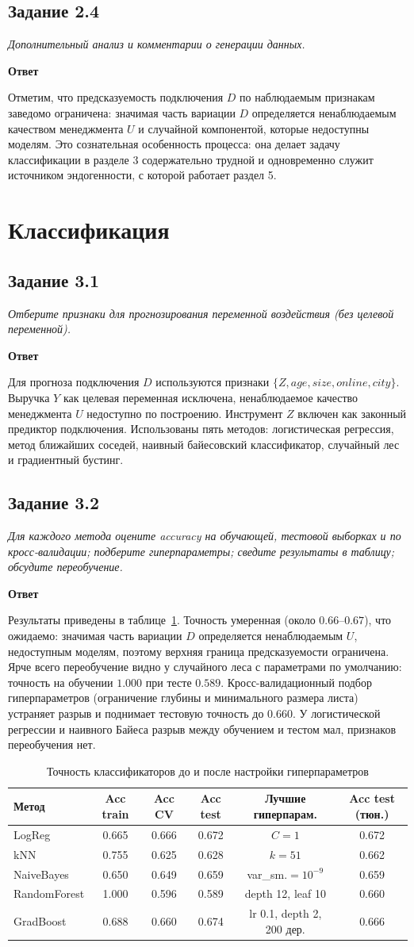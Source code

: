 \documentclass[12pt,a4paper]{article}
\newcommand{\zadanie}[2]{\subsection*{Задание #1}\begingroup\itshape #2\par\endgroup\medskip}
\newcommand{\otvet}{\par\noindent\textbf{Ответ}\par\medskip}
\begin{document}
\zadanie{2.4}{Дополнительный анализ и комментарии о генерации данных.}
\otvet
Отметим, что предсказуемость подключения $D$ по наблюдаемым признакам заведомо ограничена: значимая часть вариации $D$ определяется ненаблюдаемым качеством менеджмента $U$ и случайной компонентой, которые недоступны моделям. Это сознательная особенность процесса: она делает задачу классификации в разделе 3 содержательно трудной и одновременно служит источником эндогенности, с которой работает раздел 5.

\section{Классификация}

\zadanie{3.1}{Отберите признаки для прогнозирования переменной воздействия (без целевой переменной).}
\otvet
Для прогноза подключения $D$ используются признаки $\{Z,\textit{age},\textit{size},\textit{online},\textit{city}\}$. Выручка $Y$ как целевая переменная исключена, ненаблюдаемое качество менеджмента $U$ недоступно по построению. Инструмент $Z$ включен как законный предиктор подключения. Использованы пять методов: логистическая регрессия, метод ближайших соседей, наивный байесовский классификатор, случайный лес и градиентный бустинг.

\zadanie{3.2}{Для каждого метода оцените accuracy на обучающей, тестовой выборках и по кросс-валидации; подберите гиперпараметры; сведите результаты в таблицу; обсудите переобучение.}
\otvet
Результаты приведены в таблице~\ref{tab:clf_tuning}. Точность умеренная (около $0.66$--$0.67$), что ожидаемо: значимая часть вариации $D$ определяется ненаблюдаемым $U$, недоступным моделям, поэтому верхняя граница предсказуемости ограничена. Ярче всего переобучение видно у случайного леса с параметрами по умолчанию: точность на обучении $1.000$ при тесте $0.589$. Кросс-валидационный подбор гиперпараметров (ограничение глубины и минимального размера листа) устраняет разрыв и поднимает тестовую точность до $0.660$. У логистической регрессии и наивного Байеса разрыв между обучением и тестом мал, признаков переобучения нет.

\begin{table}[H]\centering\small
\caption{Точность классификаторов до и после настройки гиперпараметров}\label{tab:clf_tuning}
\begin{tabular}{lccccc}\toprule
Метод & Acc train & Acc CV & Acc test & Лучшие гиперпарам. & Acc test (тюн.)\\\midrule
LogReg & 0.665 & 0.666 & 0.672 & $C=1$ & 0.672\\
kNN & 0.755 & 0.625 & 0.628 & $k=51$ & 0.662\\
NaiveBayes & 0.650 & 0.649 & 0.659 & var\_sm.$=10^{-9}$ & 0.659\\
RandomForest & 1.000 & 0.596 & 0.589 & depth 12, leaf 10 & 0.660\\
GradBoost & 0.688 & 0.660 & 0.674 & lr 0.1, depth 2, 200 дер. & 0.666\\\bottomrule
\end{tabular}
\end{table}
\end{document}
